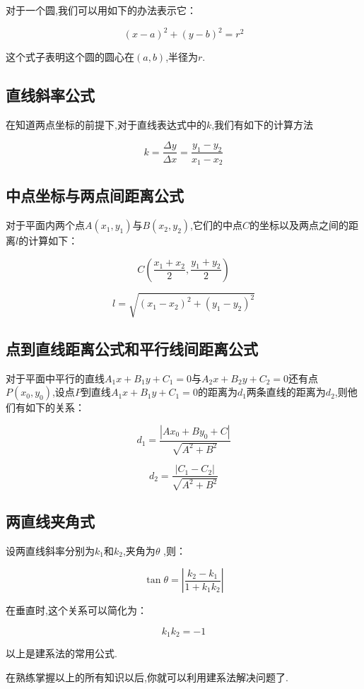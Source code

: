 \documentclass[UTF8,12pt]{ctexart}
\begin{document}
对于一个圆,我们可以用如下的办法表示它：

\[
(x-a)^2+(y-b)^2=r^2
\]

这个式子表明这个圆的圆心在$(a,b)$,半径为$r$.

\subsection{直线斜率公式}

在知道两点坐标的前提下,对于直线表达式中的$k$,我们有如下的计算方法

\[
k=\frac{\Delta y}{\Delta x}=\frac{y_1-y_2}{x_1-x_2}
\]

\subsection{中点坐标与两点间距离公式}

对于平面内两个点$A(x_1,y_1)$与$B(x_2,y_2)$,它们的中点$C$的坐标以及两点之间的距离$l$的计算如下：

\[
C(\frac{x_1+x_2}{2},\frac{y_1+y_2}{2})
\]

\[
l=\sqrt{(x_1-x_2)^2+(y_1-y_2)^2}
\]

\subsection{点到直线距离公式和平行线间距离公式}

对于平面中平行的直线$A_1x+B_1y+C_1=0$与$A_2x+B_2y+C_2=0$还有点$P(x_0,y_0)$,设点$P$到直线$A_1x+B_1y+C_1=0$的距离为$d_1$两条直线的距离为$d_2$,则他们有如下的关系：

\[
d_1=\frac{|Ax_0+By_0+C|}{\sqrt{A^2+B^2}}
\]

\[
d_2=\frac{|C_1-C_2|}{\sqrt{A^2+B^2}}
\]

\subsection{两直线夹角式}

设两直线斜率分别为$k_1$和$k_2$,夹角为$\theta$ ,则：

\[
\tan{\theta}=\left| \frac{k_2-k_1}{1+k_1k_2} \right|
\]

在垂直时,这个关系可以简化为：

\[
k_1k_2=-1
\]

以上是建系法的常用公式.

在熟练掌握以上的所有知识以后,你就可以利用建系法解决问题了.
\end{document}
